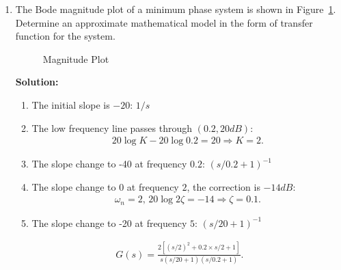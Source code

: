 \documentclass{article}
\newlength\figureheight
\newlength\figurewidth
\newcommand{\tikzdir}[1]{tikz/#1.tikz}
\newcommand{\inputtikz}[1]{}}
\begin{document}
\begin{enumerate}
  {\bf Solution:}
  \begin{enumerate}
  \item $\omega = 0$, $G(j\omega) = 0.2\angle 180^\circ$.
  \item ({\it optional}): $\angle G(j\omega) = -90$ implies that the real part of $G(j\omega) = 0$. Hence,
    \begin{align*}
      \mathfrak{Re}\left[(j\omega + 1)(-5-\omega^2 -4j\omega)\right] = 0 \Rightarrow \omega = \sqrt{5/3}.
    \end{align*}
    The corresponding point is $G(j\omega) = 0.1937\angle -90^\circ$.
  \item $\omega\rightarrow \infty$, $G(j\omega) = 0$
  \item Segment 2: origin; Segment 3: mirror reflection.

  \item Poles for the open loop transfer function: -5 (stable), 1 (unstable). $P=1$
  \item  If $K > 5$, the Nyquist plot encircles $-1$ counterclockwise once. Hence $N = -1$, $Z = N+P = 0$, the system is closed-loop stable.
  \item  If $K < 5$, the Nyquist plot does not encircle $-1$. Hence $N = 0$, $Z = N+P = 1$, the system is closed-loop unstable.
  \end{enumerate}

  \newpage
\item The Bode magnitude plot of a minimum phase system is shown in Figure~\ref{fig:1}. Determine an approximate mathematical model in the form of transfer function for the system.
  \begin{figure}[ht]
    \setlength\figureheight{8cm}
    \setlength\figurewidth{14cm}
    \centering
    \inputtikz{Quiz23}
    \caption{Magnitude Plot\label{fig:1}}
  \end{figure}

  {\bf Solution:}
  \begin{enumerate}
  \item The initial slope is $-20$: $1/s$
  \item The low frequency line passes through $(0.2,20dB)$:
    \begin{align*}
      20\log K - 20 \log 0.2 = 20\Rightarrow K = 2.
    \end{align*}
  \item The slope change to -40 at frequency $0.2$: $(s/0.2+1)^{-1}$
  \item The slope change to 0 at frequency $2$, the correction is $-14dB$:
    \begin{align*}
      \omega_n = 2,\,20\log 2\zeta = -14 \Rightarrow \zeta = 0.1.
    \end{align*}
  \item The slope change to -20 at frequency $5$: $(s/20+1)^{-1}$
  \end{enumerate}
\begin{align*}
  G(s) = \frac{2\left[(s/2)^2+0.2\times s/2+1\right]}{s(s/20+1)(s/0.2+1)}.
\end{align*}


\end{enumerate}
\end{document}
